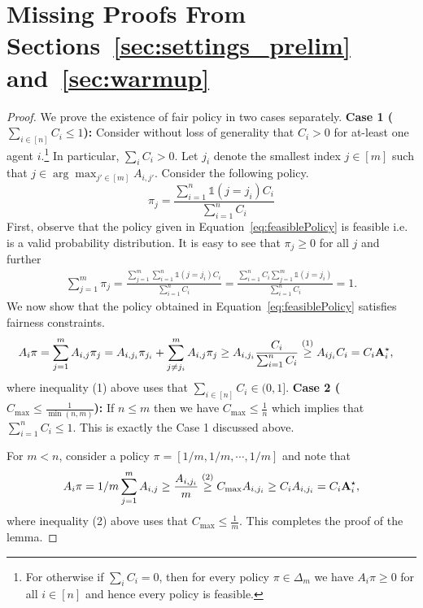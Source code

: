 \onecolumn
\appendix 
\section{Missing Proofs From Sections~\ref{sec:settings_prelim} and~\ref{sec:warmup}}
\characterization* 
\begin{proof}
\noindent 
We prove the existence of fair policy in two cases separately. 
\newline
\noindent \textbf{Case 1 ($\sum_{i \in [n]} C_i \leq 1$):}   Consider without loss of generality that $C_i > 0$ for at-least one agent $i$.\footnote{For otherwise  if $\sum_{i}C_i =0$,  then for every policy $\pi \in \Delta_m$ we have $A_i\pi \geq 0$ for all $i \in [n]$ and hence every policy is feasible. 
} In particular, $\sum_{i} C_i > 0$. Let $j_i$ denote the smallest index $j \in [m]$ such that $j  \in \arg\max_{j' \in [m]} A_{i,j'}$. Consider the following policy. 
\begin{equation}
    \pi_j = \frac{\sum_{i=1}^n \mathds{1}(j = j_i) C_i}{\sum_{i=1}^n C_i}
    \label{eq:feasiblePolicy}
\end{equation}
First, observe that the policy given in Equation~\ref{eq:feasiblePolicy} is feasible i.e. is a valid probability distribution. It is easy to see that $\pi_j \geq  0$ for all $j$ and further 
\begin{align*}
    \sum_{j=1}^m \pi_j = \frac{\sum_{j=1}^m \sum_{i=1}^n \mathds{1}(j = j_i) C_i}{\sum_{i = 1}^n C_i} = \frac{ \sum_{i=1}^n C_i \sum_{j=1}^m \mathds{1}(j = j_i)}{\sum_{i = 1}^n C_i} = 1.   
\end{align*}
We now show that the policy obtained in Equation~\ref{eq:feasiblePolicy} satisfies fairness constraints. 
\begin{align*}
    A_i \pi  &= \sum_{j=1}^m A_{i,j}\pi_j =  A_{i,j_i}\pi_{j_i} + \sum_{j \neq j_i}^m A_{i,j}\pi_j   \geq  A_{i,j_i}\frac{C_{i}}{\sum_{i=1}^n C_i} \stackrel{(1)}{\geq} A_{i j_i} C_i =  C_i \mathbf{A}^{\star}_i,     
\end{align*}
where inequality (1) above uses that $\sum_{i\in [n]}C_i\in (0, 1]$.
\newline
\textbf{Case 2 ($C_{\max} \leq \frac{1}{\min(n,m)}$): }    If $n \leq m $ then we have $ C_{\max} \leq \frac{1}{n}$ which implies that $\sum_{i=1}^n C_i \leq 1$. This is exactly the Case 1 discussed above. 

For $m < n$,  consider a policy $\pi = [1/m , 1/m, \cdots , 1/m]$ and note that 
\begin{align*}
    A_i \pi = 1/m \sum_{j =1}^m A_{i,j} \geq \frac{A_{i, j_i }}{m}  \stackrel{(2)}{\geq} C_{\max} A_{i, j_i } \geq C_i A_{i, j_i } = C_i \mathbf{A}^{\star}_i,    
\end{align*}
where inequality (2) above uses that $C_{\max}\leq \frac{1}{m}$.
This completes the proof of the lemma. 
 \end{proof} 


